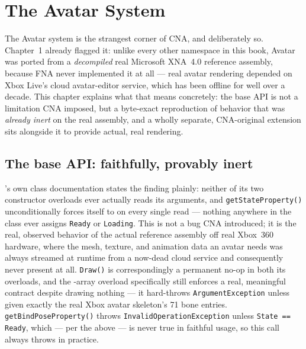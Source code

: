 \chapter{The Avatar System}
\label{ch:avatar}

The Avatar system is the strangest corner of CNA, and deliberately so. Chapter~1 already
flagged it: unlike every other namespace in this book, Avatar was ported from
a \emph{decompiled} real Microsoft XNA~4.0 reference assembly, because FNA never implemented
it at all --- real avatar rendering depended on Xbox Live's cloud avatar-editor service, which
has been offline for well over a decade. This chapter explains what that means concretely:
the base API is not a limitation CNA imposed, but a byte-exact reproduction of behavior that
was \emph{already inert} on the real assembly, and a wholly separate, CNA-original extension
sits alongside it to provide actual, real rendering.

\section{The base API: faithfully, provably inert}

's own class documentation states the finding plainly: neither of
its two constructor overloads ever actually reads its arguments, and
\texttt{getStateProperty()} unconditionally forces itself to
 on every single read --- nothing anywhere in the
class ever assigns \texttt{Ready} or \texttt{Loading}. This is not a bug CNA introduced; it is
the real, observed behavior of the actual reference assembly off real Xbox~360 hardware,
where the mesh, texture, and animation data an avatar needs was always streamed at runtime
from a now-dead cloud service and consequently never present at all. \texttt{Draw()} is
correspondingly a permanent no-op in both its overloads, and the -array
overload specifically still enforces a real, meaningful contract despite drawing nothing ---
it hard-throws \texttt{ArgumentException} unless given exactly the real Xbox avatar
skeleton's 71 bone entries. \texttt{getBindPoseProperty()} throws
\texttt{InvalidOperationException} unless \texttt{State == Ready}, which --- per the above ---
is never true in faithful usage, so this call always throws in practice.

